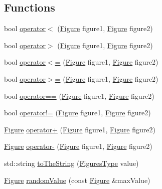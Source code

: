\subsection*{Functions}
\begin{DoxyCompactItemize}
\item 
bool \mbox{\hyperlink{namespacefop_a848b460556a75362850867d9b567ae59}{operator$<$}} (\mbox{\hyperlink{classfop_1_1_figure}{Figure}} figure1, \mbox{\hyperlink{classfop_1_1_figure}{Figure}} figure2)
\item 
bool \mbox{\hyperlink{namespacefop_a1e56aa53c205088fdeba5a4ff85b211f}{operator$>$}} (\mbox{\hyperlink{classfop_1_1_figure}{Figure}} figure1, \mbox{\hyperlink{classfop_1_1_figure}{Figure}} figure2)
\item 
bool \mbox{\hyperlink{namespacefop_a2315668c95e8c527cc00fa12d792542c}{operator$<$=}} (\mbox{\hyperlink{classfop_1_1_figure}{Figure}} figure1, \mbox{\hyperlink{classfop_1_1_figure}{Figure}} figure2)
\item 
bool \mbox{\hyperlink{namespacefop_a8989439cb0227ca3d76c92a3f515366d}{operator$>$=}} (\mbox{\hyperlink{classfop_1_1_figure}{Figure}} figure1, \mbox{\hyperlink{classfop_1_1_figure}{Figure}} figure2)
\item 
bool \mbox{\hyperlink{namespacefop_ad4c7032872695a09038ecc2d09fef5b8}{operator==}} (\mbox{\hyperlink{classfop_1_1_figure}{Figure}} figure1, \mbox{\hyperlink{classfop_1_1_figure}{Figure}} figure2)
\item 
bool \mbox{\hyperlink{namespacefop_a386a3d90ae69e900125c0a3ad5c48cdf}{operator!=}} (\mbox{\hyperlink{classfop_1_1_figure}{Figure}} figure1, \mbox{\hyperlink{classfop_1_1_figure}{Figure}} figure2)
\item 
\mbox{\hyperlink{classfop_1_1_figure}{Figure}} \mbox{\hyperlink{namespacefop_a0cdacf03236287528189a51913750a8c}{operator+}} (\mbox{\hyperlink{classfop_1_1_figure}{Figure}} figure1, \mbox{\hyperlink{classfop_1_1_figure}{Figure}} figure2)
\item 
\mbox{\hyperlink{classfop_1_1_figure}{Figure}} \mbox{\hyperlink{namespacefop_ab4ccc3243195b647632a36db88113230}{operator-\/}} (\mbox{\hyperlink{classfop_1_1_figure}{Figure}} figure1, \mbox{\hyperlink{classfop_1_1_figure}{Figure}} figure2)
\item 
std\+::string \mbox{\hyperlink{namespacefop_a4cb96232c3e9d082f2c48a97a35e2454}{to\+The\+String}} (\mbox{\hyperlink{namespacefop_a60dafe2e1ac5bb402dad57ecacde23d5}{Figures\+Type}} value)
\item 
\mbox{\hyperlink{classfop_1_1_figure}{Figure}} \mbox{\hyperlink{namespacefop_af4426fe719704633a3129439207583ce}{random\+Value}} (const \mbox{\hyperlink{classfop_1_1_figure}{Figure}} \&max\+Value)

\end{DoxyCompactItemize}
